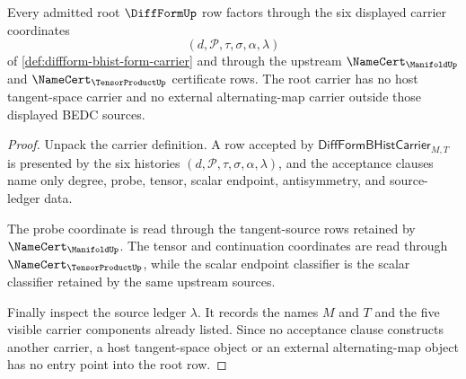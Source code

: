 \begin{theorem}
\label{thm:diffform-root-carrier-source-obligation}
Every admitted root $\DiffFormUp$ row factors through the six displayed
carrier coordinates
$$
(d,\mathcal{P},\tau,\sigma,\alpha,\lambda)
$$
of \autoref{def:diffform-bhist-form-carrier} and through the upstream
$\NameCert_{\ManifoldUp}$ and $\NameCert_{\TensorProductUp}$ certificate
rows. The root carrier has no host tangent-space carrier and no external
alternating-map carrier outside those displayed BEDC sources.
\end{theorem}
\begin{proof}
Unpack the carrier definition. A row accepted by
$\mathsf{DiffFormBHistCarrier}_{M,T}$ is presented by the six histories
$(d,\mathcal{P},\tau,\sigma,\alpha,\lambda)$, and the acceptance clauses name
only degree, probe, tensor, scalar endpoint, antisymmetry, and source-ledger
data.

The probe coordinate is read through the tangent-source rows retained by
$\NameCert_{\ManifoldUp}$. The tensor and continuation coordinates are read
through $\NameCert_{\TensorProductUp}$, while the scalar endpoint classifier is
the scalar classifier retained by the same upstream sources.

Finally inspect the source ledger $\lambda$. It records the names $M$ and $T$
and the five visible carrier components already listed. Since no acceptance
clause constructs another carrier, a host tangent-space object or an external
alternating-map object has no entry point into the root row.
\end{proof}

